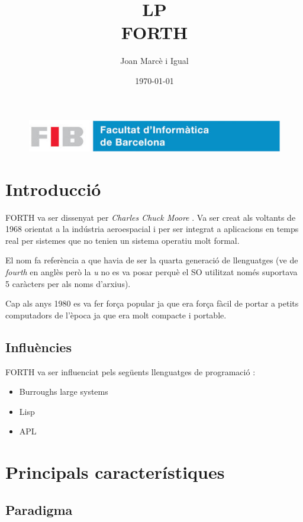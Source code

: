 \documentclass{article}
\title{
	\Huge
	\textbf{LP} \\ 
	\scshape FORTH
}
\author{
	Joan Marcè i Igual
}
\date{\today}
\begin{document}
\maketitle

\begin{figure}
	\centering
	\includegraphics[width=0.8\linewidth]{./simple_FIB}
\end{figure}
\newpage

\tableofcontents
\newpage

\section{Introducció}
FORTH va ser dissenyat per \emph{Charles Chuck Moore} \cite{forthEvolution}. Va ser creat als voltants de 1968 orientat a la indústria aeroespacial \cite{nasa} i per ser integrat a aplicacions en temps real per sistemes que no tenien un sistema operatiu molt formal. 

El nom fa referència a que havia de ser la quarta generació de llenguatges\cite{forthGroup} (ve de \emph{fourth} en anglès però la \emph{u} no es va posar perquè el SO utilitzat només suportava 5 caràcters per als noms d'arxius). 

Cap als anys 1980 es va fer força popular ja que era força fàcil de portar a petits computadors de l'època ja que era molt compacte i portable.

\subsection{Influències}

FORTH va ser influenciat pels següents llenguatges de programació \cite{wikipedia}:
\begin{itemize}
	\item Burroughs large systems
	\item Lisp
	\item APL
\end{itemize} 


\section{Principals característiques}
\subsection{Paradigma}
\end{document}
